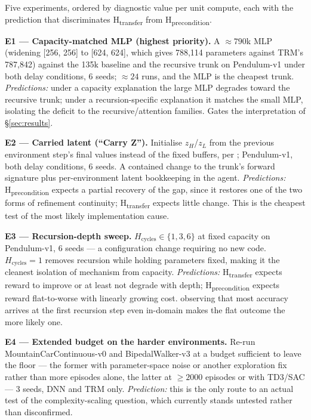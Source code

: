 \documentclass[11pt]{article}
\begin{document}
Five experiments, ordered by diagnostic value per unit compute, each with the prediction that discriminates H\textsubscript{transfer} from H\textsubscript{precondition}.

\textbf{E1 --- Capacity-matched MLP (highest priority).} A ${\approx}790$k MLP (widening [256, 256] to [624, 624], which gives 788{,}114 parameters against TRM's 787{,}842) against the 135k baseline and the recursive trunk on Pendulum-v1 under both delay conditions, 6 seeds; ${\approx}24$ runs, and the MLP is the cheapest trunk. \emph{Predictions:} under a capacity explanation the large MLP degrades toward the recursive trunk; under a recursion-specific explanation it matches the small MLP, isolating the deficit to the recursive/attention families. Gates the interpretation of \S\ref{sec:results}.

\textbf{E2 --- Carried latent (``Carry Z'').} Initialise $z_H$/$z_L$ from the previous environment step's final values instead of the fixed buffers, per \citet{dang2025hrmagent}; Pendulum-v1, both delay conditions, 6 seeds. A contained change to the trunk's forward signature plus per-environment latent bookkeeping in the agent. \emph{Predictions:} H\textsubscript{precondition} expects a partial recovery of the gap, since it restores one of the two forms of refinement continuity; H\textsubscript{transfer} expects little change. This is the cheapest test of the most likely implementation cause.

\textbf{E3 --- Recursion-depth sweep.} $H_{\text{cycles}} \in \{1, 3, 6\}$ at fixed capacity on Pendulum-v1, 6 seeds --- a configuration change requiring no new code. $H_{\text{cycles}}=1$ removes recursion while holding parameters fixed, making it the cleanest isolation of mechanism from capacity. \emph{Predictions:} H\textsubscript{transfer} expects reward to improve or at least not degrade with depth; H\textsubscript{precondition} expects reward flat-to-worse with linearly growing cost. \citet{royeazar2026trm} observing that most accuracy arrives at the first recursion step even in-domain makes the flat outcome the more likely one.

\textbf{E4 --- Extended budget on the harder environments.} Re-run MountainCarContinuous-v0 and BipedalWalker-v3 at a budget sufficient to leave the floor --- the former with parameter-space noise \citep{plappert2018paramnoise} or another exploration fix rather than more episodes alone, the latter at $\geq 2000$ episodes or with TD3/SAC --- 3 seeds, DNN and TRM only. \emph{Prediction:} this is the only route to an actual test of the complexity-scaling question, which currently stands untested rather than disconfirmed.
\end{document}

